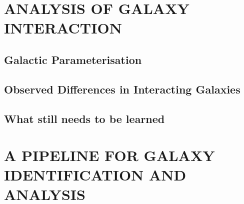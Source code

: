 \section{ANALYSIS OF GALAXY INTERACTION}
\subsection{Galactic Parameterisation}
\subsection{Observed Differences in Interacting Galaxies}
\subsection{What still needs to be learned}

\section{A PIPELINE FOR GALAXY IDENTIFICATION AND ANALYSIS}